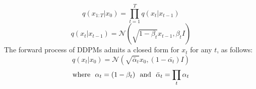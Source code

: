 \documentclass[10pt]{article} \usepackage[accepted]{tmlr}
\begin{document}
\begin{equation}
    q(x_{1:T}|x_0) = \prod_{t=1}^T q(x_t|x_{t-1})
    \label{eqn:for1}
\end{equation}
\begin{equation}
    q(x_t|x_{t-1}) = \mathcal{N}(\sqrt{1 - \beta_t}x_{t-1}, \beta_t I)
\end{equation}
The forward process of DDPMs admits a closed form for $x_t$ for any $t$, as follows:
\begin{equation}
    q(x_t|x_0) = \mathcal{N}(\sqrt{\bar{\alpha}_t}x_0, (1 - \bar{\alpha_t})I)
\end{equation}
\begin{equation}
    \textnormal{where} \:\:\: \alpha_t = (1 - \beta_t) \:\:\: \textnormal{and} \:\:\:\bar{\alpha}_t = \prod_t \alpha_t
\end{equation}
\end{document}
